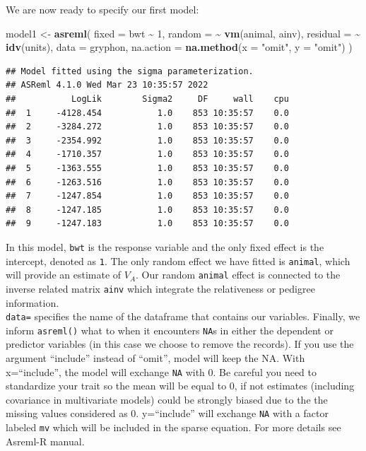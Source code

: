 \documentclass[
  12pt,
]{book}
\newenvironment{Shaded}{\begin{snugshade}}{\end{snugshade}}
\newcommand{\DataTypeTok}[1]{\textcolor[rgb]{0.13,0.29,0.53}{#1}}
\newcommand{\DecValTok}[1]{\textcolor[rgb]{0.00,0.00,0.81}{#1}}
\newcommand{\KeywordTok}[1]{\textcolor[rgb]{0.13,0.29,0.53}{\textbf{#1}}}
\newcommand{\NormalTok}[1]{#1}
\newcommand{\OperatorTok}[1]{\textcolor[rgb]{0.81,0.36,0.00}{\textbf{#1}}}
\newcommand{\StringTok}[1]{\textcolor[rgb]{0.31,0.60,0.02}{#1}}
\begin{document}
We are now ready to specify our first model:

\begin{Shaded}
\begin{Highlighting}[]
\NormalTok{model1 \textless{}{-}}\StringTok{ }\KeywordTok{asreml}\NormalTok{(}
  \DataTypeTok{fixed =}\NormalTok{ bwt }\OperatorTok{\textasciitilde{}}\StringTok{ }\DecValTok{1}\NormalTok{, }\DataTypeTok{random =} \OperatorTok{\textasciitilde{}}\StringTok{ }\KeywordTok{vm}\NormalTok{(animal, ainv),}
  \DataTypeTok{residual =} \OperatorTok{\textasciitilde{}}\StringTok{ }\KeywordTok{idv}\NormalTok{(units),}
  \DataTypeTok{data =}\NormalTok{ gryphon,}
  \DataTypeTok{na.action =} \KeywordTok{na.method}\NormalTok{(}\DataTypeTok{x =} \StringTok{"omit"}\NormalTok{, }\DataTypeTok{y =} \StringTok{"omit"}\NormalTok{)}
\NormalTok{)}
\end{Highlighting}
\end{Shaded}

\begin{verbatim}
## Model fitted using the sigma parameterization.
## ASReml 4.1.0 Wed Mar 23 10:35:57 2022
##           LogLik        Sigma2     DF     wall    cpu
##  1     -4128.454           1.0    853 10:35:57    0.0
##  2     -3284.272           1.0    853 10:35:57    0.0
##  3     -2354.992           1.0    853 10:35:57    0.0
##  4     -1710.357           1.0    853 10:35:57    0.0
##  5     -1363.555           1.0    853 10:35:57    0.0
##  6     -1263.516           1.0    853 10:35:57    0.0
##  7     -1247.854           1.0    853 10:35:57    0.0
##  8     -1247.185           1.0    853 10:35:57    0.0
##  9     -1247.183           1.0    853 10:35:57    0.0
\end{verbatim}

In this model, \texttt{bwt} is the response variable and the only fixed effect is the intercept, denoted as \texttt{1}. The only random effect we have fitted is \texttt{animal}, which will provide an estimate of \(V_A\). Our random \texttt{animal} effect is connected to the inverse related matrix \texttt{ainv} which integrate the relativeness or pedigree information.\\
\texttt{data=} specifies the name of the dataframe that contains our variables. Finally, we inform \texttt{asreml()} what to when it encounters \texttt{NA}s in either the dependent or predictor variables (in this case we choose to remove the records).
If you use the argument ``include'' instead of ``omit'', model will keep the NA. With x=``include'', the model will exchange \texttt{NA} with 0. Be careful you need to standardize your trait so the mean will be equal to 0, if not estimates (including covariance in multivariate models) could be strongly biased due to the the missing values considered as 0. y=``include'' will exchange \texttt{NA} with a factor labeled \texttt{mv} which will be included in the sparse equation. For more details see Asreml-R manual.
\end{document}
